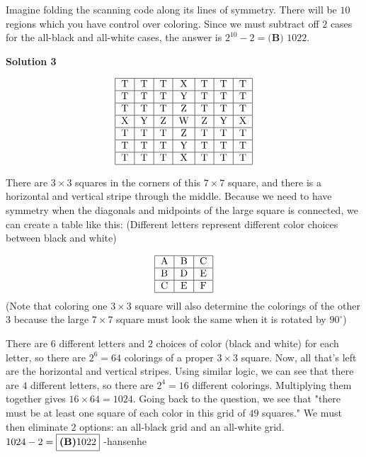 \begin{enumerate}
 Imagine folding the scanning code along its lines of symmetry. There will be $10$ regions which you have control over coloring. Since we must subtract off $2$ cases for the all-black and all-white cases, the answer is $2^{10}-2=\boxed{\textbf{(B) } 1022.}$




\textbf{Solution 3}


 \[\begin{tabular}{|c|c|c|c|c|c|c|} \hline T & T & T & X & T & T & T \\ \hline T & T & T & Y& T & T & T \\ \hline T & T & T & Z & T & T & T \\ \hline X & Y & Z & W & Z & Y & X \\ \hline T & T & T & Z & T & T & T \\ \hline T & T & T & Y & T & T & T \\ \hline T & T & T & X & T & T & T \\ \hline \end{tabular}\]

 There are $3 \times 3$ squares in the corners of this $7 \times 7$ square, and there is a horizontal and vertical stripe through the middle. Because we need to have symmetry when the diagonals and midpoints of the large square is connected, we can create a table like this: (Different letters represent different color choices between black and white)

 
 \[\begin{tabular}{|c|c|c|} \hline A & B & C \\ \hline B & D & E \\ \hline C & E & F \\ \hline \end{tabular}\](Note that coloring one $3 \times 3$ square will also determine the colorings of the other $3$ because the large $7 \times 7$ square must look the same when it is rotated by $90^\circ$)

 There are $6$ different letters and $2$ choices of color (black and white) for each letter, so there are $2^6=64$ colorings of a proper $3 \times 3$ square. Now, all that's left are the horizontal and vertical stripes. Using similar logic, we can see that there are $4$ different letters, so there are $2^4=16$ different colorings. Multiplying them together gives $16 \times 64 = 1024$. Going back to the question, we see that "there must be at least one square of each color in this grid of $49$ squares." We must then eliminate $2$ options: an all-black grid and an all-white grid. $1024-2= \boxed{\textbf{(B)} 1022} \\ \phantom{}$ -hansenhe


\end{enumerate}
